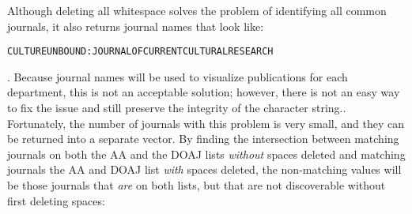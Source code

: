 \documentclass{article}
\begin{document}
Although deleting all whitespace solves the problem of identifying all common journals, it also returns journal names that look like: {\large \begin{verbatim}CULTUREUNBOUND:JOURNALOFCURRENTCULTURALRESEARCH \end{verbatim}}.
Because journal names will be used to visualize publications for each department, this is not an acceptable solution; however, there is not an easy way to fix the issue and still preserve the integrity of the character string..
Fortunately, the number of journals with this problem is very small, and they can be returned into a separate vector.
By finding the intersection between matching journals on both the AA and the DOAJ lists \emph{without} spaces deleted and matching journals the AA and DOAJ list \emph{with} spaces deleted, the non-matching values will be those journals that \emph{are} on both lists, but that are not discoverable without first deleting spaces:
\end{document}

